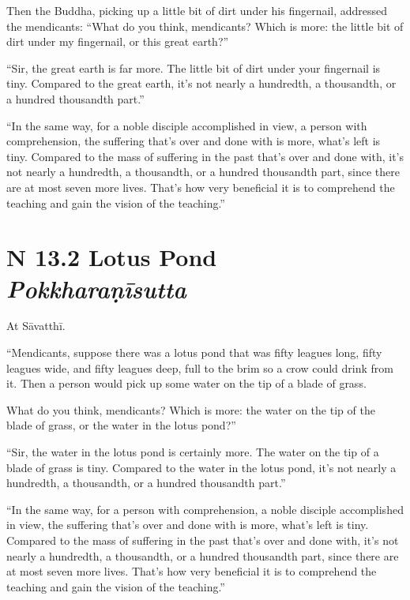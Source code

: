 \documentclass[12pt,openany]{book}%
\newcommand*{\suttatitleacronym}[1]{\smaller[2]{#1}\vspace*{.3em}}
\newcommand*{\suttatitletranslation}[1]{\linebreak{#1}}
\newcommand*{\suttatitleroot}[1]{\linebreak\smaller[2]\itshape{#1}}
\newcommand*{\tocacronym}[1]{\hspace*{-3.3em}{#1}\quad}
\newcommand*{\toctranslation}[1]{#1}
\newcommand*{\tocroot}[1]{(\textit{#1})}
\begin{document}
Then the Buddha, picking up a little bit of dirt under his fingernail, addressed the mendicants: “What do you think, mendicants? Which is more: the little bit of dirt under my fingernail, or this great earth?” 

“Sir, the great earth is far more. The little bit of dirt under your fingernail is tiny. Compared to the great earth, it’s not nearly a hundredth, a thousandth, or a hundred thousandth part.” 

“In the same way, for a noble disciple accomplished in view, a person with comprehension, the suffering that’s over and done with is more, what’s left is tiny. Compared to the mass of suffering in the past that’s over and done with, it’s not nearly a hundredth, a thousandth, or a hundred thousandth part, since there are at most seven more lives. That’s how very beneficial it is to comprehend the teaching and gain the vision of the teaching.” 

%
\section*{{\suttatitleacronym SN 13.2}{\suttatitletranslation A Lotus Pond }{\suttatitleroot Pokkharaṇīsutta}}
\addcontentsline{toc}{section}{\tocacronym{SN 13.2} \toctranslation{A Lotus Pond } \tocroot{Pokkharaṇīsutta}}

At \textsanskrit{Sāvatthī}. 

“Mendicants, suppose there was a lotus pond that was fifty leagues long, fifty leagues wide, and fifty leagues deep, full to the brim so a crow could drink from it. Then a person would pick up some water on the tip of a blade of grass. 

What do you think, mendicants? Which is more: the water on the tip of the blade of grass, or the water in the lotus pond?” 

“Sir, the water in the lotus pond is certainly more. The water on the tip of a blade of grass is tiny. Compared to the water in the lotus pond, it’s not nearly a hundredth, a thousandth, or a hundred thousandth part.” 

“In the same way, for a person with comprehension, a noble disciple accomplished in view, the suffering that’s over and done with is more, what’s left is tiny. Compared to the mass of suffering in the past that’s over and done with, it’s not nearly a hundredth, a thousandth, or a hundred thousandth part, since there are at most seven more lives. That’s how very beneficial it is to comprehend the teaching and gain the vision of the teaching.” 
\end{document}
